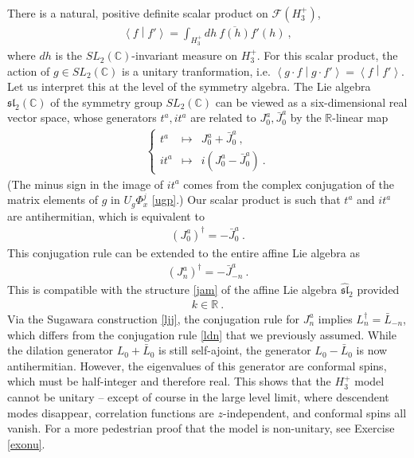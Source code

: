 \documentclass[12pt, a4paper, notitlepage, twoside]{report}
\numberwithin{equation}{section}
\theoremstyle{break}
\begin{document}
There is a natural, positive definite scalar product on $\mathcal{F}(H_3^+)$, 
\begin{align}
 \left\langle f \middle| f' \right\rangle = \int_{H_3^+} dh\ \overline{f(h)} f'(h)\ ,
\end{align}
where $dh$ is the $SL_2({\mathbb{C}})$-invariant measure on $H_3^+$.
For this scalar product, the action of $g\in SL_2({\mathbb{C}})$ is a unitary tranformation, i.e. $\left\langle g\cdot f \middle| g\cdot f'\right\rangle = \left\langle f \middle| f'\right\rangle $.
Let us interpret this at the level of the symmetry algebra.
The Lie algebra $\mathfrak{sl}_2({\mathbb{C}})$ of the symmetry group $SL_2({\mathbb{C}})$ can be viewed as a six-dimensional real vector space, whose generators $t^a,it^a$ are related to $J^a_0, \bar{J}^a_0$ by the ${\mathbb{R}}$-linear map
\begin{align}
 \left\{\begin{array}{lcl} t^a & \mapsto & J_0^a + \bar{J}_0^a \ ,  \\ it^a & \mapsto & i(J^a_0 - \bar{J}^a_0)\ . \end{array}\right. 
\end{align}
(The minus sign in the image of $it^a$ comes from the complex conjugation of the matrix elements of $g$ in $U_g\Phi^j_{x}$ \eqref{ugp}.)
Our scalar product is such that $t^a$ and $it^a$ are antihermitian, which is equivalent to
\begin{align}
 (J^a_0)^\dagger = -\bar{J}^a_0\ .
\label{jzd}
\end{align}
This conjugation rule can be extended to the entire affine Lie algebra as 
\begin{align}
 \boxed{(J^a_n)^\dagger = -\bar{J}^a_{-n}}\ .
\label{jdj}
\end{align}
This is compatible with the structure \eqref{jam} of the affine Lie algebra $\hat{\mathfrak{sl}}_2$ provided 
\begin{align}
 k\in\mathbb{R}\ .
\label{kir}
\end{align}
Via the Sugawara construction \eqref{ljj}, the conjugation rule for $J^a_n$ implies $L_n^\dagger = \bar{L}_{-n}$, which differs from the conjugation rule \eqref{ldn} that we previously assumed. While the dilation generator $L_0+\bar L_0$ is still self-ajoint, the generator $L_0-\bar L_0$ is now antihermitian. However, the eigenvalues of this generator are conformal spins, which must be half-integer and therefore real. This shows that the $H_3^+$ model cannot be unitary -- except of course in the large level limit, where descendent modes disappear, correlation functions are $z$-independent, and conformal spins all vanish. For a more pedestrian proof that the model is non-unitary, see Exercise \ref{exonu}.
\end{document}
